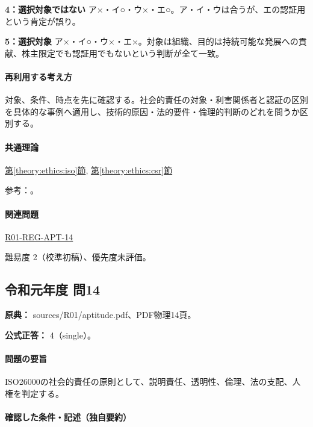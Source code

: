 \noindent\textbf{4：選択対象ではない} ア×・イ○・ウ×・エ○。ア・イ・ウは合うが、エの認証用という肯定が誤り。\par

\noindent\textbf{5：選択対象} ア×・イ○・ウ×・エ×。対象は組織、目的は持続可能な発展への貢献、株主限定でも認証用でもないという判断が全て一致。\par

\paragraph{再利用する考え方} 対象、条件、時点を先に確認する。社会的責任の対象・利害関係者と認証の区別を具体的な事例へ適用し、技術的原因・法的要件・倫理的判断のどれを問うか区別する。

\paragraph{共通理論} \hyperref[theory:ethics:iso]{第\ref*{theory:ethics:iso}節}, \hyperref[theory:ethics:csr]{第\ref*{theory:ethics:csr}節}

\par 参考：\cite{iso26000,iso26000_project2010}。

\paragraph{関連問題} \hyperref[q:r01-reg-apt-14]{R01-REG-APT-14}

\par 難易度 2（校準初稿）、優先度未評価。

\subsection{令和元年度 問14}
\label{q:r01-reg-apt-14}

\noindent\textbf{原典：} sources/R01/aptitude.pdf、PDF物理14頁。

\textbf{公式正答：} 4（single）。

\paragraph{問題の要旨} ISO26000の社会的責任の原則として、説明責任、透明性、倫理、法の支配、人権を判定する。

\paragraph{確認した条件・記述（独自要約）}\mbox{}\par

